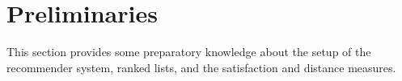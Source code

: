 \section{Preliminaries}\label{sec:preliminaries}
This section provides some preparatory knowledge about the setup of the recommender system, ranked lists, and the satisfaction and distance measures.

